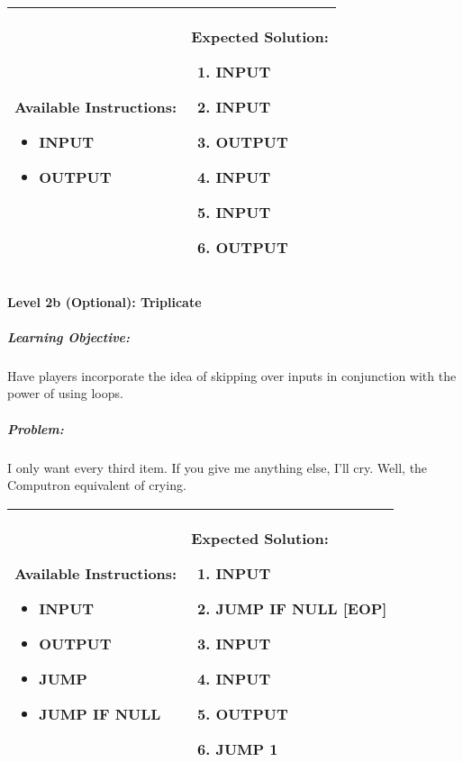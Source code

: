 \begin{center}
    \begin{tabular}{ | m{5cm} | m{9cm} | } 
        \hline
            \textbf{Available Instructions:} 
            \begin{itemize}
                \setlength\itemsep{-.35em}
                \item INPUT
                \item OUTPUT
            \end{itemize}& 
            \textbf{Expected Solution:} 
            \begin{enumerate}
                \setlength\itemsep{-.35em}
                \item INPUT
                \item INPUT
                \item OUTPUT
                \item INPUT
                \item INPUT
                \item OUTPUT
            \end{enumerate}
            \\
        \hline
    \end{tabular}
\end{center}


\paragraph{Level 2b (Optional): Triplicate}
\subparagraph{Learning Objective:} Have players incorporate the idea of skipping over inputs in conjunction with the power of using loops.

\subparagraph{Problem:} I only want every third item. If you give me anything else, I'll cry. Well, the Computron equivalent of crying.

\begin{center}
    \begin{tabular}{ | m{5cm} | m{9cm} | } 
        \hline
            \textbf{Available Instructions:} 
            \begin{itemize}
                \setlength\itemsep{-.35em}
                \item INPUT
                \item OUTPUT
		\item JUMP
		\item JUMP IF NULL
            \end{itemize}& 
            \textbf{Expected Solution:} 
            \begin{enumerate}
                \setlength\itemsep{-.35em}
                \item INPUT
		\item JUMP IF NULL [EOP]
		\item INPUT
		\item INPUT
                \item OUTPUT
		\item JUMP 1
            \end{enumerate}
            \\
        \hline
    \end{tabular}
\end{center}


